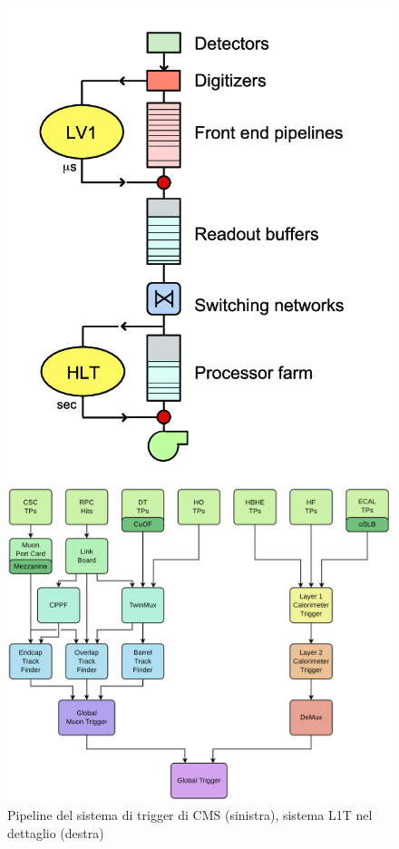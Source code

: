 \begin{figure}[t]
  \centering
  \begin{minipage}[b]{0.40\textwidth}
      \centering
      \includegraphics[width=\textwidth]{../ImmaginiTesi/TriggerSystem2.png} 
    \end{minipage}
    \hfill 
    \begin{minipage}[t]{0.58\textwidth}
      \centering
      \includegraphics[width=\textwidth]{../ImmaginiTesi/TriggerSystemUpdate.png} 
  \end{minipage}
  \caption{Pipeline del sistema di trigger di CMS (sinistra), sistema L1T nel dettaglio (destra)}
  \label{fig:TriggerSystem}
\end{figure}

